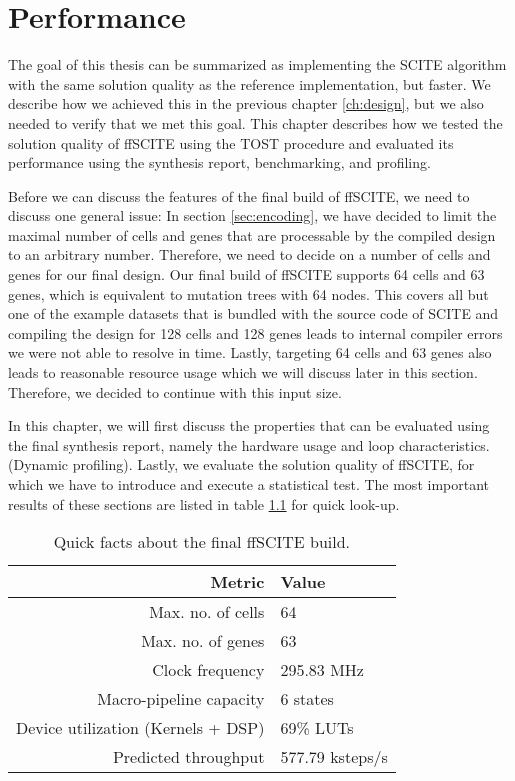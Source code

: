 \chapter{Performance}
\label{ch:performance}

The goal of this thesis can be summarized as implementing the \ac{SCITE} algorithm with the same solution quality as the reference implementation, but faster. We describe how we achieved this in the previous chapter \ref{ch:design}, but we also needed to verify that we met this goal. This chapter describes how we tested the solution quality of \ac{ffSCITE} using the \ac{TOST} procedure \cite{schuirmann1987comparison} and evaluated its performance using the synthesis report, benchmarking, and profiling. 

Before we can discuss the features of the final build of \ac{ffSCITE}, we need to discuss one general issue: In section \ref{sec:encoding}, we have decided to limit the maximal number of cells and genes that are processable by the compiled design to an arbitrary number. Therefore, we need to decide on a number of cells and genes for our final design. Our final build of \ac{ffSCITE} supports 64 cells and 63 genes, which is equivalent to mutation trees with 64 nodes. This covers all but one of the example datasets that is bundled with the source code of \ac{SCITE} and compiling the design for 128 cells and 128 genes leads to internal compiler errors we were not able to resolve in time. Lastly, targeting 64 cells and 63 genes also leads to reasonable resource usage which we will discuss later in this section. Therefore, we decided to continue with this input size.

In this chapter, we will first discuss the properties that can be evaluated using the final synthesis report, namely the hardware usage and loop characteristics. (Dynamic profiling). Lastly, we evaluate the solution quality of \ac{ffSCITE}, for which we have to introduce and execute a statistical test. The most important results of these sections are listed in table \ref{tab:quickfacts} for quick look-up.

\begin{table}
    \centering
    \begin{tabular}{r|l}
        \textbf{Metric}                     & \textbf{Value} \\
        \hline
        Max. no. of cells                   & 64 \\
        Max. no. of genes                   & 63 \\
        Clock frequency                     & 295.83 MHz \\
        Macro-pipeline capacity             & 6 states \\
        Device utilization (Kernels + DSP)  & 69\% \acsp{LUT} \\
        Predicted throughput                & 577.79 ksteps/s \\
    \end{tabular}
    \caption{Quick facts about the final \ac{ffSCITE} build.}
    \label{tab:quickfacts}
\end{table}




